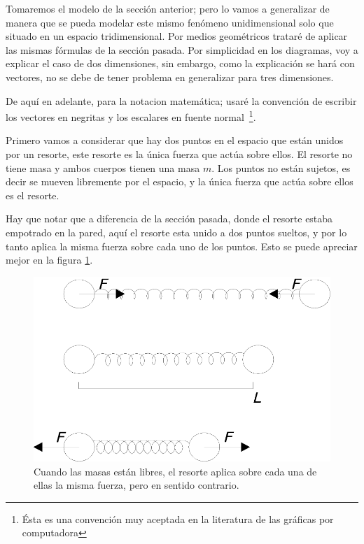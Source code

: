 Tomaremos el modelo de la sección anterior; pero lo vamos a generalizar de manera que se pueda modelar este mismo fenómeno unidimensional solo que situado en un espacio tridimensional.
Por medios geométricos trataré de aplicar las mismas fórmulas de la sección pasada.
Por simplicidad en los diagramas, voy a explicar el caso de dos dimensiones, sin embargo, como la explicación se hará con vectores, no se debe de tener problema en generalizar para tres dimensiones.

De aquí en adelante, para la notacion matemática; usaré la convención de escribir los vectores en negritas y los escalares en fuente normal~\footnote{Ésta es una convención muy aceptada en la literatura de las gráficas por computadora}.

Primero vamos a considerar que hay dos puntos en el espacio que están unidos por un resorte, este resorte es la única fuerza que actúa sobre ellos.
El resorte no tiene masa y ambos cuerpos tienen una masa $m$.
Los puntos no están sujetos, es decir se mueven libremente por el espacio, y la única fuerza que actúa sobre ellos es el resorte.

Hay que notar que a diferencia de la sección pasada, donde el resorte estaba empotrado en la pared, aquí el resorte esta unido a dos puntos sueltos, y por lo tanto aplica la misma fuerza sobre cada uno de los puntos.
Esto se puede apreciar mejor en la figura \ref{masaSuelta:fig}.

\begin{figure}
 \centering
 \includegraphics[]{Img/masa_suelta}
 \caption[Masas libres en el espacio unidas por un resorte]{ 
 Cuando las masas están libres, el resorte aplica sobre cada una de ellas la misma fuerza, pero en sentido contrario.
 } \label{masaSuelta:fig}
\end{figure}

